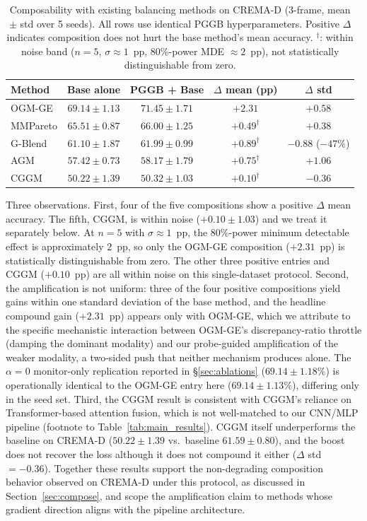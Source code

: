 \documentclass{article} %
\begin{document}
\begin{table}[H]
\centering
\caption{Composability with existing balancing methods on CREMA-D (3-frame, mean $\pm$ std over 5 seeds). All rows use identical PGGB hyperparameters. Positive $\Delta$ indicates composition does not hurt the base method's mean accuracy. $^\dagger$: within noise band ($n{=}5$, $\sigma \approx 1$~pp, 80\%-power MDE $\approx 2$~pp), not statistically distinguishable from zero.}
\label{tab:composability}
\begin{tabular}{lcccc}
\toprule
\textbf{Method} & \textbf{Base alone} & \textbf{PGGB + Base} & \textbf{$\Delta$ mean (pp)} & \textbf{$\Delta$ std} \\
\midrule
OGM-GE   & $69.14 \pm 1.13$ & $71.45 \pm 1.71$ & $\mathbf{+2.31}$ & $+0.58$ \\
MMPareto & $65.51 \pm 0.87$ & $66.00 \pm 1.25$ & $+0.49^\dagger$ & $+0.38$ \\
G-Blend  & $61.10 \pm 1.87$ & $61.99 \pm 0.99$ & $+0.89^\dagger$ & $\mathbf{-0.88}$ ($-47\%$) \\
AGM      & $57.42 \pm 0.73$ & $58.17 \pm 1.79$ & $+0.75^\dagger$ & $+1.06$ \\
CGGM     & $50.22 \pm 1.39$ & $50.32 \pm 1.03$ & $+0.10^\dagger$ & $-0.36$ \\
\bottomrule
\end{tabular}
\end{table}

Three observations. First, four of the five compositions show a positive $\Delta$ mean accuracy. The fifth, CGGM, is within noise ($+0.10 \pm 1.03$) and we treat it separately below. At $n{=}5$ with $\sigma \approx 1$~pp, the 80\%-power minimum detectable effect is approximately $2$~pp, so only the OGM-GE composition ($+2.31$~pp) is statistically distinguishable from zero. The other three positive entries and CGGM ($+0.10$~pp) are all within noise on this single-dataset protocol. Second, the amplification is not uniform: three of the four positive compositions yield gains within one standard deviation of the base method, and the headline compound gain ($+2.31$~pp) appears only with OGM-GE, which we attribute to the specific mechanistic interaction between OGM-GE's discrepancy-ratio throttle (damping the dominant modality) and our probe-guided amplification of the weaker modality, a two-sided push that neither mechanism produces alone. The $\alpha{=}0$ monitor-only replication reported in \S\ref{sec:ablations} ($69.14 \pm 1.18\%$) is operationally identical to the OGM-GE entry here ($69.14 \pm 1.13\%$), differing only in the seed set. Third, the CGGM result is consistent with CGGM's reliance on Transformer-based attention fusion, which is not well-matched to our CNN/MLP pipeline (footnote to Table~\ref{tab:main_results}). CGGM itself underperforms the baseline on CREMA-D ($50.22 \pm 1.39$ vs.\ baseline $61.59 \pm 0.80$), and the boost does not recover the loss although it does not compound it either ($\Delta$ std $=-0.36$). Together these results support the non-degrading composition behavior observed on CREMA-D under this protocol, as discussed in Section~\ref{sec:compose}, and scope the amplification claim to methods whose gradient direction aligns with the pipeline architecture.
\end{document}
